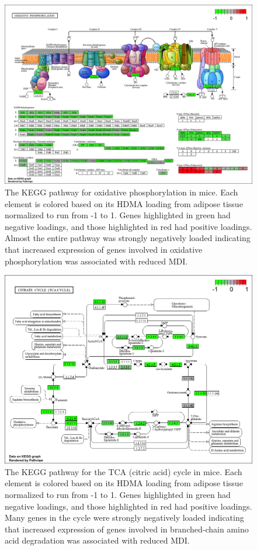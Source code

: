\documentclass[
]{article}
\begin{document}
\begin{figure}[ht!]
\includegraphics[width=\textwidth]{Figures/Supp_Fig_OxPhos.png} 
\caption{The KEGG pathway for oxidative phosphorylation in 
mice. Each element is colored based on its HDMA loading from adipose
tissue normalized to run from -1 to 1. Genes highlighted in green had 
negative loadings, and those highlighted in red had positive loadings. 
Almost the entire pathway was strongly negatively loaded indicating 
that increased expression of genes involved in oxidative phosphorylation
was associated with reduced MDI.
}
\label{fig:oxPhos}
\end{figure}

\begin{figure}[ht!]
\includegraphics[width=\textwidth]{Figures/Supp_Fig_TCA.png} 
\caption{The KEGG pathway for the TCA (citric acid) cycle in 
mice. Each element is colored based on its HDMA loading from adipose
tissue normalized to run from -1 to 1. Genes highlighted in green had 
negative loadings, and those highlighted in red had positive loadings. 
Many genes in the cycle were strongly negatively loaded indicating 
that increased expression of genes involved in branched-chain amino acid 
degradation was associated with reduced MDI.
}
\label{fig:TCA_cycle}
\end{figure}
\end{document}
